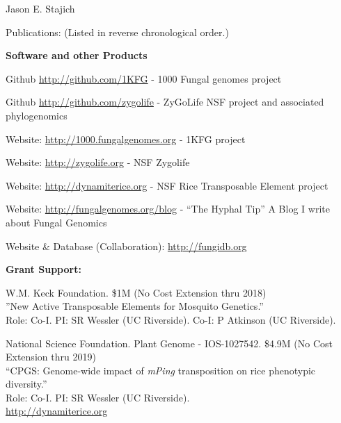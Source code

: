 \documentclass[10pt]{article}
\begin{document}
\begin{cv}{\centerline{Jason E. Stajich}}
\begin{cvlist}{Publications: (Listed in reverse chronological order.)}
\begin{cvlistcompact}{\bf Software and other Products}
 \item Github \url{http://github.com/1KFG} - 1000 Fungal
   genomes project
\item Github \url{http://github.com/zygolife} - ZyGoLife NSF project
  and associated phylogenomics
\item Website: \url{http://1000.fungalgenomes.org} - 1KFG project
\item Website: \url{http://zygolife.org} - NSF Zygolife
\item Website: \url{http://dynamiterice.org} - NSF Rice Transposable
    Element project
\item Website: \url{http://fungalgenomes.org/blog} - ``The Hyphal
  Tip'' A Blog I write about Fungal Genomics
\item Website \& Database (Collaboration): \url{http://fungidb.org}
\end{cvlistcompact}


\end{cvlist}
\setlength{\cvlabelwidth}{24mm}


\begin{cvlistcompact}{\bf Grant Support:}
\item [{\bf Ongoing support}]

\item [2011-2016] W.M. Keck Foundation. \$1M (No Cost Extension thru 2018) \\
''New Active Transposable Elements for Mosquito Genetics.'' \\
Role: Co-I. PI: SR Wessler (UC Riverside). Co-I: P Atkinson (UC Riverside). 

\item [2011-2017] National Science Foundation. Plant Genome -
  IOS-1027542. \$4.9M  (No Cost Extension thru 2019) \\
  ``CPGS: Genome-wide impact of \textit{mPing} transposition on rice phenotypic diversity.'' \\
Role: Co-I. PI: SR Wessler (UC Riverside). \\
\url{http://dynamiterice.org}


\end{cvlistcompact}
\end{cv}
\end{document}
